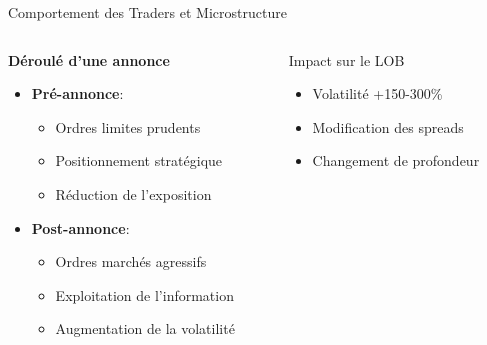 \documentclass[aspectratio=169]{beamer}  %
\begin{document}
\begin{frame}{Comportement des Traders et Microstructure}
    \begin{columns}
        \begin{column}{0.6\textwidth}
            \textbf{Déroulé d'une annonce}
            \begin{itemize}
                \item \textbf{Pré-annonce}:
                \begin{itemize}
                    \item Ordres limites prudents
                    \item Positionnement stratégique
                    \item Réduction de l'exposition
                \end{itemize}
                \item \textbf{Post-annonce}:
                \begin{itemize}
                    \item Ordres marchés agressifs
                    \item Exploitation de l'information
                    \item Augmentation de la volatilité
                \end{itemize}
            \end{itemize}
        \end{column}
        \begin{column}{0.4\textwidth}
            \begin{alertblock}{Impact sur le LOB}
                \begin{itemize}
                    \item Volatilité +150-300\%
                    \item Modification des spreads
                    \item Changement de profondeur
                \end{itemize}
            \end{alertblock}
        \end{column}
    \end{columns}
\end{frame}
\end{document}
